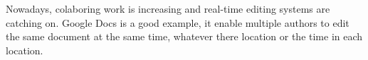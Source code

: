 Nowadays, colaboring work is increasing and real-time editing systems are catching on. Google Docs is a good example, it enable multiple authors to edit the same document at the same time, whatever there location or the time in each location. 